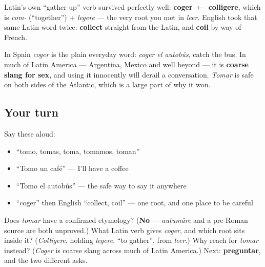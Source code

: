 \begin{culture}
Latin's own \textquotedblleft{}gather up\textquotedblright{} verb survived perfectly well: \textbf{coger} $\leftarrow$ \textbf{colligere}, which is \emph{com-} (\textquotedblleft{}together\textquotedblright{}) + \emph{legere} — the very root you met in \emph{leer}. English took that same Latin word twice: \textbf{collect} straight from the Latin, and \textbf{coil} by way of French.

In Spain \emph{coger} is the plain everyday word: \emph{coger el autobús}, catch the bus. In much of Latin America — Argentina, Mexico and well beyond — it is \textbf{coarse slang for sex}, and using it innocently will derail a conversation. \emph{Tomar} is safe on both sides of the Atlantic, which is a large part of why it won.
\end{culture}

\subsection*{Your turn}
Say these aloud:

\begin{itemize}
\raggedright
  \item \textquotedblleft{}tomo, tomas, toma, tomamos, toman\textquotedblright{}
  \item \textquotedblleft{}Tomo un café\textquotedblright{} — I'll have a coffee
  \item \textquotedblleft{}Tomo el autobús\textquotedblright{} — the safe way to say it anywhere
  \item \textquotedblleft{}coger\textquotedblright{} then English \textquotedblleft{}collect, coil\textquotedblright{} — one root, and one place to be careful
\end{itemize}

\begin{tcolorbox}[breakable,colback=teal!4,colframe=teal!35!black,title={Before you move on}]
Does \emph{tomar} have a confirmed etymology? (\textbf{No} — \emph{autumāre} and a pre-Roman source are both unproved.) What Latin verb gives \emph{coger}, and which root sits inside it? (\emph{Colligere}, holding \emph{legere}, \textquotedblleft{}to gather\textquotedblright{}, from \emph{leer}.) Why reach for \emph{tomar} instead? (\emph{Coger} is coarse slang across much of Latin America.) Next: \textbf{preguntar}, and the two different asks.
\end{tcolorbox}

